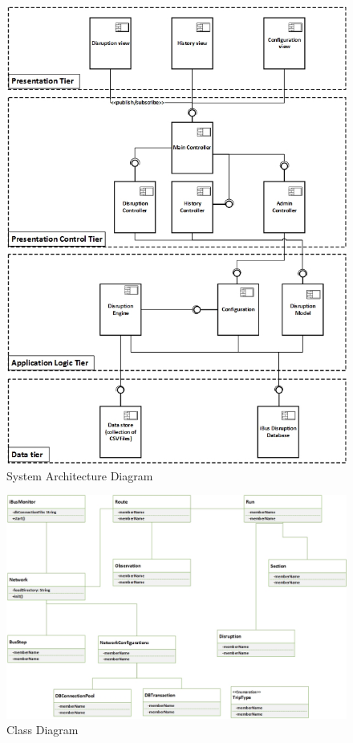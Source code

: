 \begin{figure}[!htb]
\centering
	\includegraphics[scale=0.8]{Figures/Architecture.jpg}
\caption{System Architecture Diagram\label{overflow}}
\end{figure}

\begin{figure}[!htb]
\centering
	\includegraphics[scale=0.8]{Figures/Class.jpg}
\caption{Class Diagram\label{overflow}}
\end{figure}

